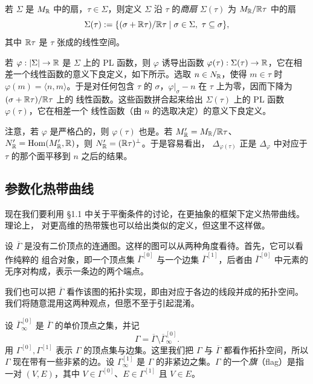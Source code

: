 \begin{definition}
若 $\Sigma$ 是 $M_{\mathbb{R}}$ 中的扇，$\tau\in\Sigma$，则定义 $\Sigma$ 沿 $\tau$ 的\emph{商扇}
$\Sigma(\tau)$ 为 $M_{\mathbb{R}}/\mathbb{R}\tau$ 中的扇
\[
  \Sigma(\tau):=\{(\sigma+\mathbb{R}\tau)/\mathbb{R}\tau \mid \sigma\in\Sigma,\ \tau\subseteq\sigma\},
\]
其中 $\mathbb{R}\tau$ 是 $\tau$ 张成的线性空间。

若 $\varphi:|\Sigma|\to\mathbb{R}$ 是 $\Sigma$ 上的 PL 函数，则 $\varphi$ 诱导出函数
$\varphi(\tau):\Sigma(\tau)\to\mathbb{R}$，它在相差一个线性函数的意义下良定义，如下所示。选取
$n\in N_{\mathbb{R}}$，使得 $m\in\tau$ 时 $\varphi(m)=\langle n,m\rangle$。于是对任何包含 $\tau$ 的
$\sigma$，$\varphi|_\sigma-n$ 在 $\tau$ 上为零，因而下降为 $(\sigma+\mathbb{R}\tau)/\mathbb{R}\tau$ 上的
线性函数。这些函数拼合起来给出 $\Sigma(\tau)$ 上的 PL 函数 $\varphi(\tau)$，它在相差一个
线性函数（由 $n$ 的选取决定）的意义下良定义。

注意，若 $\varphi$ 是严格凸的，则 $\varphi(\tau)$ 也是。若 $M'_{\mathbb{R}}=M_{\mathbb{R}}/\mathbb{R}\tau$、
$N'_{\mathbb{R}}=\operatorname{Hom}(M'_{\mathbb{R}},\mathbb{R})$，则 $N'_{\mathbb{R}}=(\mathbb{R}\tau)^\perp$。于是容易看出，
$\Delta_{\varphi(\tau)}$ 正是 $\Delta_\varphi$ 中对应于 $\tau$ 的那个面平移到 $n$ 之后的结果。
\end{definition}


\subsection{参数化热带曲线}

现在我们要利用 §1.1 中关于平衡条件的讨论，在更抽象的框架下定义热带曲线。理论上，
对更高维的热带簇也可以给出类似的定义，但这里不这样做。

设 $\overline\Gamma$ 是没有二价顶点的连通图。这样的图可以从两种角度看待。首先，它可以看作纯粹的
组合对象，即一个顶点集 $\overline\Gamma^{[0]}$ 与一个边集 $\overline\Gamma^{[1]}$，后者由
$\overline\Gamma^{[0]}$ 中元素的无序对构成，表示一条边的两个端点。

我们也可以把 $\overline\Gamma$ 看作该图的拓扑实现，即由对应于各边的线段并成的拓扑空间。
我们将随意混用这两种观点，但愿不至于引起混淆。

设 $\overline\Gamma^{[0]}_\infty$ 是 $\overline\Gamma$ 的单价顶点之集，并记
\[
  \Gamma=\overline\Gamma\setminus\overline\Gamma^{[0]}_\infty .
\]
用 $\Gamma^{[0]},\Gamma^{[1]}$ 表示 $\Gamma$ 的顶点集与边集。这里我们把 $\Gamma$ 与
$\overline\Gamma$ 都看作拓扑空间，所以 $\Gamma$ 现在带有一些非紧的边。设
$\Gamma^{[1]}_\infty$ 是 $\Gamma$ 的非紧边之集。$\Gamma$ 的一个\emph{旗}（flag）是指一对
$(V,E)$，其中 $V\in\Gamma^{[0]}$、$E\in\Gamma^{[1]}$ 且 $V\in E$。


